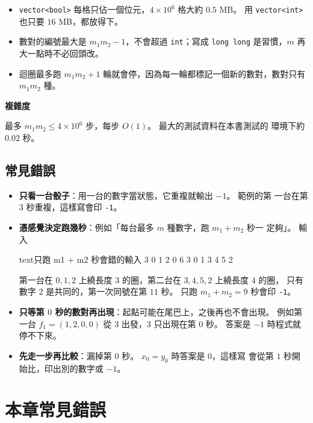 
\begin{itemize}
\item \texttt{vector<bool>} 每格只佔一個位元，$4 \times 10^6$ 格大約 $0.5$ MB。
用 \texttt{vector<int>} 也只要 $16$ MB，都放得下。
\item 數對的編號最大是 $m_1 m_2 - 1$，不會超過 \texttt{int}；寫成
\texttt{long long} 是習慣，$m$ 再大一點時不必回頭改。
\item 迴圈最多跑 $m_1 m_2 + 1$ 輪就會停，因為每一輪都標記一個新的數對，數對只有
$m_1 m_2$ 種。
\end{itemize}

\textbf{複雜度}

最多 $m_1 m_2 \le 4 \times 10^6$ 步，每步 $O(1)$。 最大的測試資料在本書測試的
環境下約 $0.02$ 秒。

\subsection{常見錯誤}

\begin{itemize}
\item \textbf{只看一台骰子}：用一台的數字當狀態，它重複就輸出 $-1$。 範例的第
一台在第 $3$ 秒重複，這樣寫會印 \texttt{-1}。
\item \textbf{憑感覺決定跑幾秒}：例如「每台最多 $m$ 種數字，跑 $m_1 + m_2$ 秒一
定夠」。 輸入
\begin{code}{text}{只跑 m1 + m2 秒會錯的輸入}
3 0
1 2 0
6 3
0 1 3 4 5 2
\end{code}
第一台在 $0, 1, 2$ 上繞長度 $3$ 的圈，第二台在 $3, 4, 5, 2$ 上繞長度 $4$ 的圈，
只有數字 $2$ 是共同的，第一次同號在第 $11$ 秒。 只跑 $m_1 + m_2 = 9$ 秒會印
\texttt{-1}。
\item \textbf{只等第 $0$ 秒的數對再出現}：起點可能在尾巴上，之後再也不會出現。
例如第一台 $f_1 = (1, 2, 0, 0)$ 從 $3$ 出發，$3$ 只出現在第 $0$ 秒。 答案是 $-1$
時程式就停不下來。
\item \textbf{先走一步再比較}：漏掉第 $0$ 秒。 $x_0 = y_0$ 時答案是 $0$，這樣寫
會從第 $1$ 秒開始比，印出別的數字或 $-1$。
\end{itemize}

\section{本章常見錯誤}
\label{sec:dsu-pitfalls}

